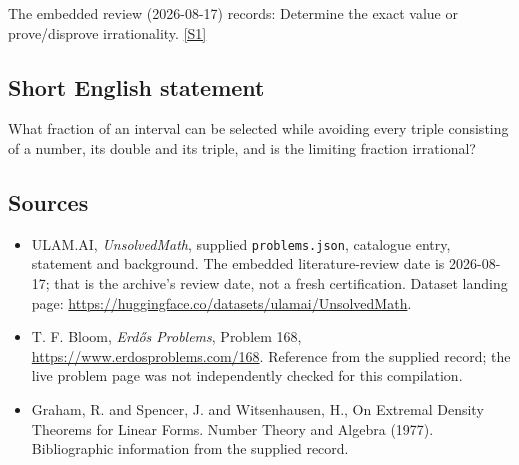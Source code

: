 \documentclass[11pt,a4paper]{article}
\newcommand{\sref}[2]{\hyperlink{source:#1:#2}{[S#2]}}
\begin{document}
The embedded review (2026-08-17) records: Determine the exact value or prove/disprove irrationality. \sref{statement}{1}

\subsection{Short English statement}

What fraction of an interval can be selected while avoiding every triple consisting of a number, its double and its triple, and is the limiting fraction irrational?

\subsection{Sources}

{\small

\begin{itemize}

\item[\hypertarget{source:statement:1}{S1}] ULAM.AI, \emph{UnsolvedMath}, supplied \texttt{problems.json}, catalogue entry, statement and background. The embedded literature-review date is 2026-08-17; that is the archive’s review date, not a fresh certification. Dataset landing page: \url{https://huggingface.co/datasets/ulamai/UnsolvedMath}.

\item[\hypertarget{source:statement:2}{S2}] T. F. Bloom, \emph{Erdős Problems}, Problem 168, \url{https://www.erdosproblems.com/168}. Reference from the supplied record; the live problem page was not independently checked for this compilation.

\item[\hypertarget{source:statement:3}{S3}] Graham, R. and Spencer, J. and Witsenhausen, H., On Extremal Density Theorems for Linear Forms. Number Theory and Algebra (1977). Bibliographic information from the supplied record.

\end{itemize}

}

\label{end:statement}
\end{document}
